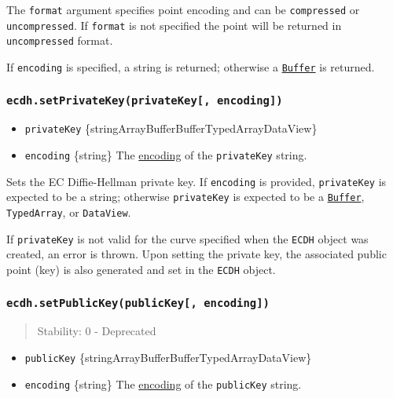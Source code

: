 The \texttt{format} argument specifies point encoding and can be
\texttt{\textquotesingle{}compressed\textquotesingle{}} or
\texttt{\textquotesingle{}uncompressed\textquotesingle{}}. If
\texttt{format} is not specified the point will be returned in
\texttt{\textquotesingle{}uncompressed\textquotesingle{}} format.

If \texttt{encoding} is specified, a string is returned; otherwise a
\href{buffer.md}{\texttt{Buffer}} is returned.

\subsubsection{\texorpdfstring{\texttt{ecdh.setPrivateKey(privateKey{[},\ encoding{]})}}{ecdh.setPrivateKey(privateKey{[}, encoding{]})}}\label{ecdh.setprivatekeyprivatekey-encoding}

\begin{itemize}
\tightlist
\item
  \texttt{privateKey}
  \{string\textbar ArrayBuffer\textbar Buffer\textbar TypedArray\textbar DataView\}
\item
  \texttt{encoding} \{string\} The
  \href{buffer.md\#buffers-and-character-encodings}{encoding} of the
  \texttt{privateKey} string.
\end{itemize}

Sets the EC Diffie-Hellman private key. If \texttt{encoding} is
provided, \texttt{privateKey} is expected to be a string; otherwise
\texttt{privateKey} is expected to be a
\href{buffer.md}{\texttt{Buffer}}, \texttt{TypedArray}, or
\texttt{DataView}.

If \texttt{privateKey} is not valid for the curve specified when the
\texttt{ECDH} object was created, an error is thrown. Upon setting the
private key, the associated public point (key) is also generated and set
in the \texttt{ECDH} object.

\subsubsection{\texorpdfstring{\texttt{ecdh.setPublicKey(publicKey{[},\ encoding{]})}}{ecdh.setPublicKey(publicKey{[}, encoding{]})}}\label{ecdh.setpublickeypublickey-encoding}

\begin{quote}
Stability: 0 - Deprecated
\end{quote}

\begin{itemize}
\tightlist
\item
  \texttt{publicKey}
  \{string\textbar ArrayBuffer\textbar Buffer\textbar TypedArray\textbar DataView\}
\item
  \texttt{encoding} \{string\} The
  \href{buffer.md\#buffers-and-character-encodings}{encoding} of the
  \texttt{publicKey} string.
\end{itemize}

